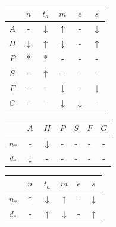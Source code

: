 \begin{table}
\begin{tabular}{c|c|c|c|c|c}
        &   $n$             &   $t_a$           &   $m$             &   $e$             &   $s$             \\
    \hline
    $A$ &   -               &   $\downarrow$    &   $\uparrow$      &   -               &   $\downarrow$    \\
    $H$ &   $\downarrow$    &   $\uparrow$      &   $\downarrow$    &   -               &   $\uparrow$      \\
    $P$ &   *               &   *               &   -               &   -               &   -               \\
    $S$ &   -               &   $\uparrow$      &   -               &   -               &   -               \\
    $F$ &   -               &   -               &   $\downarrow$    &   -               &   $\downarrow$    \\
    $G$ &   -               &   -               &   $\downarrow$    &   $\downarrow$    &   -
\end{tabular}
\end{table}

\begin{table}
\begin{tabular}{c|c|c|c|c|c|c}
            &   $A$             &   $H$             &   $P$ &   $S$ &   $F$ &   $G$ \\
    \hline
    $n_*$   &   -               &   $\downarrow$    &   -   &   -   &   -   &   -   \\
    $d_*$   &   $\downarrow$    &   -               &   -   &   -   &   -   &   -
\end{tabular}
\end{table}

\begin{table}
\begin{tabular}{c|c|c|c|c|c}
            &   $n$             &   $t_a$           &   $m$             &   $e$             &   $s$             \\
    \hline
    $n_*$   &   $\uparrow$      &   $\downarrow$    &   $\uparrow$      &   -               &   $\downarrow$    \\
    $d_*$   &   -               &   $\uparrow$      &   $\downarrow$    &   -               &   $\uparrow$      \\
\end{tabular}
\end{table}

